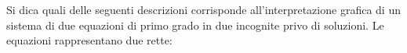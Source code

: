 Si dica quali delle seguenti descrizioni corrisponde 
all'interpretazione grafica di un sistema di due equazioni 
di primo grado in due incognite privo di soluzioni.
Le equazioni rappresentano due rette: 
